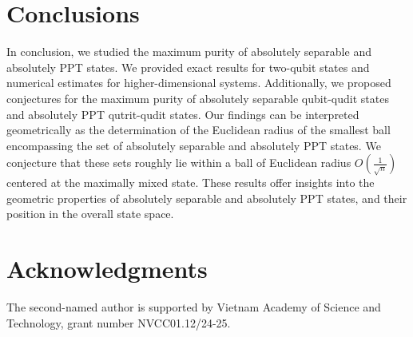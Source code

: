 \documentclass[reqno, 12pt,a4letter]{amsart}
\theoremstyle{definition}
\theoremstyle{plain}
\begin{document}
\section{Conclusions}
In conclusion, we studied the maximum purity of absolutely separable and absolutely PPT states. We provided exact results for two-qubit states and numerical estimates for higher-dimensional systems. Additionally, we proposed conjectures for the maximum purity of absolutely separable qubit-qudit states and absolutely PPT qutrit-qudit states. Our findings can be interpreted geometrically as the determination of the Euclidean radius of the smallest ball encompassing the set of absolutely separable and absolutely PPT states. We conjecture that these sets roughly lie within a ball of Euclidean radius $O(\frac1{\sqrt{n}})$ centered at the maximally mixed state. These results offer insights into the geometric properties of absolutely separable and absolutely PPT states, and their position in the overall state space.


\section*{Acknowledgments}

The second-named author is supported by Vietnam Academy of Science and Technology, grant number NVCC01.12/24-25.
\end{document}
